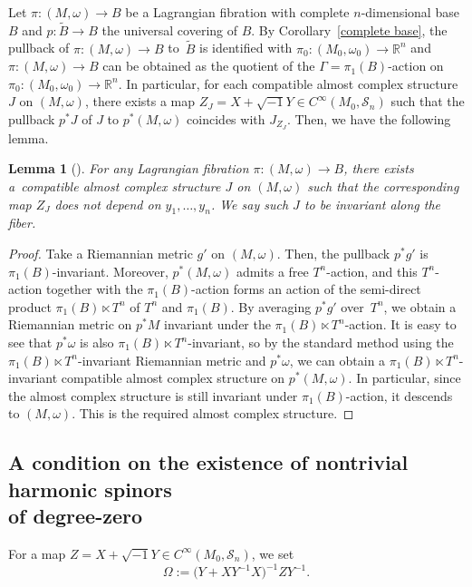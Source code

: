 \documentclass[10pt,a4paper]{amsart}
\numberwithin{equation}{section}
\newtheorem{Lemma}[Theorem]{Lemma}
\newcommand{\R}{\mathbb{R}}
\renewcommand{\tilde}{\widetilde}
\begin{document}
Let $\pi\colon (M,\omega)\to B$ be a Lagrangian fibration with complete $n$-dimensional base $B$ and $p\colon \tilde B\to B$ the universal covering of $B$. By Corollary~\ref{complete base}, the pullback of $\pi\colon (M,\omega)\to B$ to~$\tilde B$ is identified with $\pi_0\colon (M_0,\omega_0)\to \R^n$ and $\pi\colon (M,\omega)\to B$ can be obtained as the quotient of the $\Gamma=\pi_1(B)$-action on $\pi_0\colon (M_0,\omega_0)\to \R^n$. In particular, for each compatible almost complex structure $J$ on $(M,\omega)$, there exists a map $Z_J=X+\sqrt{-1}Y\in C^\infty\left(M_0,{\mathcal S}_n\right)$ such that the pullback $p^*J$ of $J$ to $p^*(M,\omega)$ coincides with $J_{Z_J}$. Then, we have the following lemma.
\begin{Lemma}[\textup{\cite[Corollary~9.15]{FFY2}}]\label{invariant J}
For any Lagrangian fibration $\pi\colon (M,\omega)\to B$, there exists a~compatible almost complex structure $J$ on $(M,\omega)$ such that the corresponding map $Z_J$ does not depend on $y_1,\ldots ,y_n$. We say such $J$ to be invariant along the fiber.
\end{Lemma}
\begin{proof}
Take a Riemannian metric $g'$ on $(M,\omega)$. Then, the pullback $p^*g'$ is $\pi_1(B)$-invariant. Moreover, $p^*(M,\omega)$ admits a free $T^n$-action, and this $T^n$-action together with the $\pi_1(B)$-action forms an action of the semi-direct product $\pi_1(B)\ltimes T^n$ of $T^n$ and $\pi_1(B)$. By averaging $p^*g'$ over~$T^n$, we obtain a Riemannian metric on $p^*M$ invariant under the $\pi_1(B)\ltimes T^n$-action. It is easy to see that $p^*\omega$ is also $\pi_1(B)\ltimes T^n$-invariant, so by the standard method using the $\pi_1(B)\ltimes T^n$-invariant Riemannian metric and $p^*\omega$, we can obtain a $\pi_1(B)\ltimes T^n$-invariant compatible almost complex structure on $p^*(M,\omega)$. In particular, since the almost complex structure is still invariant under $\pi_1(B)$-action, it descends to $(M,\omega)$. This is the required almost complex structure.
\end{proof}

\subsection[A condition on the existence of nontrivial harmonic spinors of degree-zero]{A condition on the existence of nontrivial harmonic spinors\\ of degree-zero}
\label{Spin-c Dirac operator}
For a map $Z=X+\sqrt{-1}Y\in C^\infty ( M_0,{\mathcal S}_n)$, we set
\begin{equation}\label{Omega}
\Omega:=\bigl(Y+XY^{-1}X\bigr)^{-1}ZY^{-1}.
\end{equation}
\end{document}
